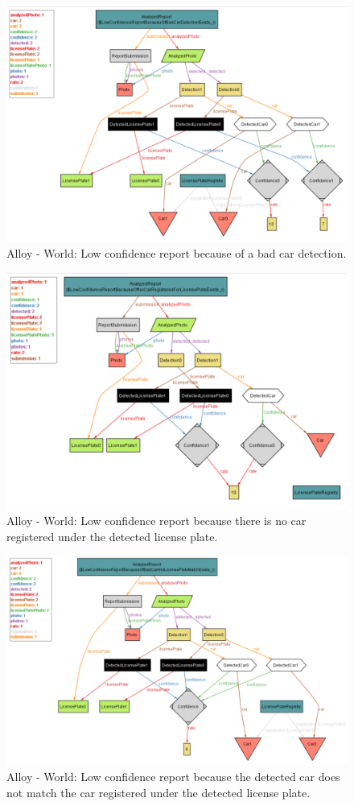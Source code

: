 \begin{figure}[H]
    \centering
    \includegraphics[width=\textwidth]{Images/alloy/13.png}
    \caption{\label{fig:alloy}Alloy - World: Low confidence report because of a bad car detection.}
\end{figure}

\begin{figure}[H]
    \centering
    \includegraphics[width=\textwidth]{Images/alloy/14.png}
    \caption{\label{fig:alloy}Alloy - World: Low confidence report because there is no car registered under the detected license plate.}
\end{figure}

\begin{figure}[H]
    \centering
    \includegraphics[width=\textwidth]{Images/alloy/15.png}
    \caption{\label{fig:alloy}Alloy - World: Low confidence report because the detected car does not match the car registered under the detected license plate.}
\end{figure}

